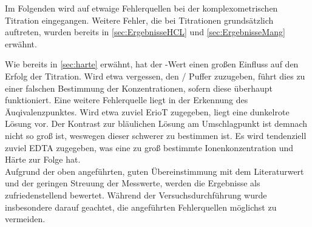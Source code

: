 \documentclass{article}
\begin{document}
        Im Folgenden wird auf etwaige Fehlerquellen bei der komplexometrischen Titration eingegangen. Weitere Fehler, die bei Titrationen grundsätzlich auftreten, wurden bereits in \ref{sec:ErgebnisseHCL} und \ref{sec:ErgebnisseMang} erwähnt.  
        
        Wie bereits in \ref{sec:harte} erwähnt, hat der \pH-Wert einen großen Einfluss auf den Erfolg der Titration. Wird etwa vergessen, den / Puffer zuzugeben, führt dies zu einer falschen Bestimmung der Konzentrationen, sofern diese überhaupt funktioniert. Eine weitere Fehlerquelle liegt in der Erkennung des Äuqivalenzpunktes. Wird etwa zuviel ErioT zugegeben, liegt eine dunkelrote Lösung vor. Der Kontrast zur bläulichen Lösung am Umschlagpunkt ist demnach nicht so groß ist, weswegen dieser schwerer zu bestimmen ist. Es wird tendenziell zuviel EDTA zugegeben, was eine zu groß bestimmte Ionenkonzentration und Härte zur Folge hat. \\
        
       Aufgrund der oben angeführten, guten Übereinstimmung mit dem Literaturwert und der geringen Streuung der Messwerte, werden die Ergebnisse als zufriedenstellend bewertet. Während der Versuchsdurchführung wurde insbesondere darauf geachtet, die angeführten Fehlerquellen möglichst zu vermeiden.
       
  \pagebreak
  
  \listofreactions
  \printbibliography[title=Literaturverzeichnis]
  \listoftables
  
\end{document}
